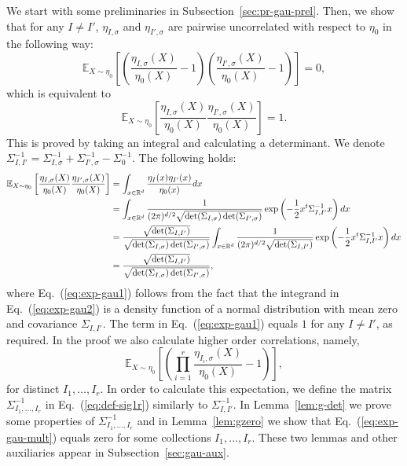 \documentclass[final, 12pt]{colt2018}
\newcommand{\subsecref}[1]{Subsection~\ref{#1}}
\renewcommand{\eqref}[1]{Eq.~(\ref{#1})}
\newcommand{\lemref}[1]{Lemma~\ref{#1}}
\begin{document}
We start with some preliminaries in \subsecref{sec:pr-gau-prel}. Then, we show that for any $I \ne I'$, $\eta_{I,\sigma}$ and $\eta_{I',\sigma}$ are pairwise uncorrelated with respect to $\eta_0$ in the following way:
\[
\mathbb{E}_{X \sim \eta_0} \left[\left(\frac{\eta_{I,\sigma}(X)}{\eta_0(X)} - 1\right) \left(\frac{\eta_{I',\sigma}(X)}{\eta_0(X)} -1 \right) \right] = 0,
\]
which is equivalent to
\[
\mathbb{E}_{X \sim \eta_0} \left[\frac{\eta_{I,\sigma}(X)}{\eta_0(X)} \frac{\eta_{I',\sigma}(X)}{\eta_0(X)} \right] = 1.
\]
This is proved by taking an integral and calculating a determinant. We denote $\Sigma_{I,I'}^{-1} = \Sigma_{I,\sigma}^{-1} + \Sigma_{I',\sigma}^{-1} - \Sigma_0^{-1}$. The following holds:
\begin{align}
\mathbb{E}_{X \sim \eta_0} \left[\frac{\eta_{I,\sigma}(X)}{\eta_0(X)} \frac{\eta_{I',\sigma}(X)}{\eta_0(X)} \right]
&=\int_{x\in \mathbb{R}^d} \frac{\eta_{I}(x) \eta_{I'}(x)}{\eta_0(x)}dx \notag\\
&= \int_{x \in \mathbb{R}^d} \frac{1}{(2\pi)^{d/2}\sqrt{\det(\Sigma_{I,\sigma}) \det(\Sigma_{I',\sigma})}} \exp\left(-\frac{1}{2}x^t \Sigma_{I,I'}^{-1} x\right) dx\notag\\
&= \frac{\sqrt{\det(\Sigma_{I,I'})}}{\sqrt{\det(\Sigma_{I,\sigma})\det(\Sigma_{I',\sigma})}} \int_{x \in \mathbb{R}^d} \frac{1}{(2\pi)^{d/2}\sqrt{\det(\Sigma_{I,I'})}} \exp\left(-\frac{1}{2}x^t \Sigma_{I,I'}^{-1} x\right) dx \label{eq:exp-gau2}\\
&= \frac{\sqrt{\det(\Sigma_{I,I'})}}{\sqrt{\det(\Sigma_{I,\sigma})\det(\Sigma_{I',\sigma})}} \label{eq:exp-gau1},
\end{align}
where \eqref{eq:exp-gau1} follows from the fact that the integrand in \eqref{eq:exp-gau2} is a density function of a normal distribution with mean zero and covariance $\Sigma_{I,I'}$. The term in \eqref{eq:exp-gau1} equals $1$ for any $I \ne I'$, as required. In the proof we also calculate higher order correlations, namely, 
\begin{equation} \label{eq:exp-gau-mult} 
\mathbb{E}_{X \sim \eta_0} \left[\left(\prod_{i=1}^r \frac{\eta_{I_i,\sigma}(X)}{\eta_0(X)} -1 \right) \right],
\end{equation}
for distinct $I_1, \dots, I_r$. In order to calculate this expectation, we define the matrix $\Sigma_{I_1,\dots,I_r}^{-1}$ in \eqref{eq:def-sig1r} similarly to $\Sigma_{I,I'}^{-1}$. In \lemref{lem:g-det} we prove some properties of $\Sigma_{I_1,\dots,I_r}^{-1}$ and in \lemref{lem:gzero} we show that \eqref{eq:exp-gau-mult} equals zero for some collections $I_1,\dots,I_r$. These two lemmas and other auxiliaries appear in \subsecref{sec:gau-aux}.
\end{document}
